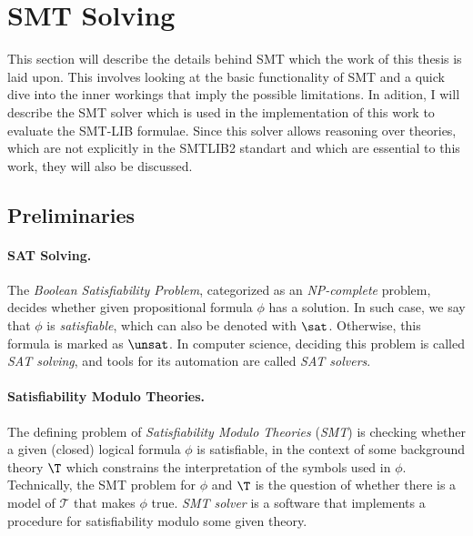 \section{SMT Solving}
\label{sec:smt}


This section will describe the details behind SMT which the work of this thesis is laid upon.
This involves looking at the basic functionality of SMT and a quick dive into the inner workings that imply the possible limitations.
In adition, I will describe the \ziii SMT solver which is used in the implementation of this work to evaluate the SMT-LIB formulae.
Since this solver allows reasoning over theories, which are not explicitly in the SMTLIB2 standart and which are essential to this work, they will also be discussed.

\subsection{Preliminaries}

\paragraph{SAT Solving.}
The \emph{Boolean Satisfiability Problem}, categorized as an \emph{NP-complete} problem, decides whether given propositional formula $\phi$ has a solution.
In such case, we say that $\phi$ is \emph{satisfiable}, which can also be denoted with $\sat$.
Otherwise, this formula is marked as $\unsat$.
In computer science, deciding this problem is called \emph{SAT solving}, and tools for its automation are called \emph{SAT solvers}.


\paragraph{Satisfiability Modulo Theories.}
The defining problem of \emph{Satisfiability Modulo Theories} (\emph{SMT}) is checking whether a given (closed) logical formula $\phi$ is satisfiable, in the context of some background theory $\T$ which constrains the interpretation of the symbols used in $\phi$.\cite{smt:sm-theories, smt:first-ord-logic}
Technically, the SMT problem for $\phi$ and $\T$ is the question of whether there is a model of $\mathcal{T}$ that makes $\phi$ true.
\emph{SMT solver} is a software that implements a procedure for satisfiability modulo some given theory. 

